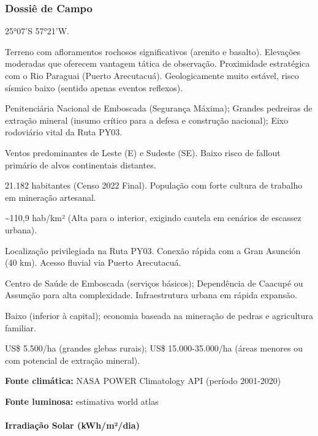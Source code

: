 \subsubsection{Dossiê de Campo}
\begin{description}[style=nextline,leftmargin=0.5cm,font=\bfseries]
\item[Coordenadas]  25°07'S 57°21'W.
\item[Topografia]  Terreno com afloramentos rochosos significativos (arenito e basalto). Elevações moderadas que oferecem vantagem tática de observação. Proximidade estratégica com o Rio Paraguai (Puerto Arecutacuá). Geologicamente muito estável, risco sísmico baixo (sentido apenas eventos reflexos).
\item[Alvos Estratégicos]  Penitenciária Nacional de Emboscada (Segurança Máxima); Grandes pedreiras de extração mineral (insumo crítico para a defesa e construção nacional); Eixo rodoviário vital da Ruta PY03.
\item[Fallout]  Ventos predominantes de Leste (E) e Sudeste (SE). Baixo risco de fallout primário de alvos continentais distantes.
\item[População]  21.182 habitantes (Censo 2022 Final). População com forte cultura de trabalho em mineração artesanal.
\item[Densidade]  \textasciitilde 110,9 hab/\allowbreak km² (Alta para o interior, exigindo cautela em cenários de escassez urbana).
\item[Vias de Acesso]  Localização privilegiada na Ruta PY03. Conexão rápida com a Gran Asunción (40 km). Acesso fluvial via Puerto Arecutacuá.
\item[Serviços]  Centro de Saúde de Emboscada (serviços básicos); Dependência de Caacupé ou Assunção para alta complexidade. Infraestrutura urbana em rápida expansão.
\item[Custo de Vida]  Baixo (inferior à capital); economia baseada na mineração de pedras e agricultura familiar.
\item[Preço da Terra]  US\$ 5.500/\allowbreak ha (grandes glebas rurais); US\$ 15.000-35.000/\allowbreak ha (áreas menores ou com potencial de extração mineral).
\end{description}
\textbf{Fonte climática:} NASA POWER Climatology API (período 2001-2020)

\textbf{Fonte luminosa:} estimativa world atlas

\paragraph{Irradiação Solar
(kWh/\allowbreak m²/\allowbreak dia)}

